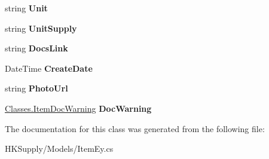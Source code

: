 \begin{DoxyCompactItemize}
\item 
\mbox{\label{class_h_k_supply_1_1_models_1_1_item_ey_a017c88703ee28eb98c2fa3bbdf5acb3d}} 
string {\bfseries Unit}
\item 
\mbox{\label{class_h_k_supply_1_1_models_1_1_item_ey_a1c60f92b2cbcbdf9a50495a0877d4ada}} 
string {\bfseries Unit\+Supply}
\item 
\mbox{\label{class_h_k_supply_1_1_models_1_1_item_ey_aaaf1a1d3286e33778ca66795e84bae46}} 
string {\bfseries Docs\+Link}
\item 
\mbox{\label{class_h_k_supply_1_1_models_1_1_item_ey_a99324717e74995941240deb54b8ff069}} 
Date\+Time {\bfseries Create\+Date}
\item 
\mbox{\label{class_h_k_supply_1_1_models_1_1_item_ey_ae17be1a41445d6299c1641c5d7e22a4f}} 
string {\bfseries Photo\+Url}
\item 
\mbox{\label{class_h_k_supply_1_1_models_1_1_item_ey_a328fa0024767dac1e28b07456886bb88}} 
\mbox{\hyperlink{class_h_k_supply_1_1_classes_1_1_item_doc_warning}{Classes.\+Item\+Doc\+Warning}} {\bfseries Doc\+Warning}
\end{DoxyCompactItemize}


The documentation for this class was generated from the following file\+:\begin{DoxyCompactItemize}
\item 
H\+K\+Supply/\+Models/Item\+Ey.\+cs\end{DoxyCompactItemize}
